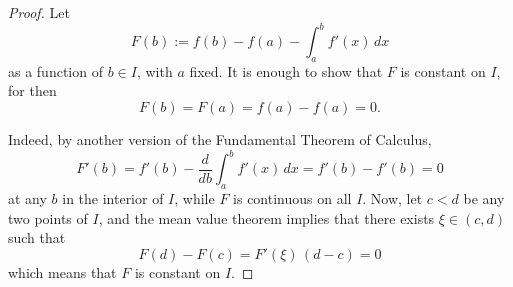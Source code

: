 

\begin{proof}

Let 
$$
F(b) := f(b) - f(a) - \int_a^b f'(x)\,dx 
$$
as a function of $b\in I$, with $a$ fixed. It is enough to 
show that $F$ is constant on $I$, for then 
$$
F(b) = F(a) = f(a) - f(a) = 0.
$$

Indeed, by another version of the Fundamental Theorem of Calculus,
$$
F'(b) = f'(b) - \frac{d}{db}\int_a^b f'(x)\,dx = f'(b) - f'(b) = 0
$$
at any $b$ in the interior of $I$, while $F$ is continuous on all $I$. 
Now, let $c<d$ be any two points of $I$, and the mean value theorem 
implies that there exists $\xi\in (c,d)$ such that
$$
F(d) - F(c) = F'(\xi)\, (d-c) = 0
$$
which means that $F$ is constant on $I$.

\end{proof}

